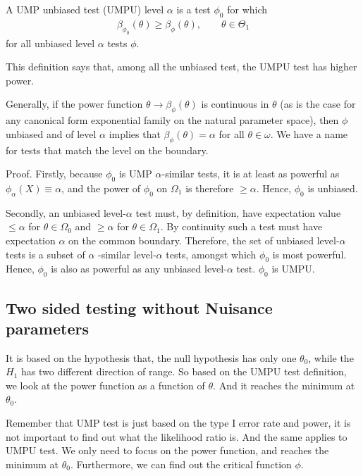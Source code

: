 \documentclass[11pt]{article} %
\begin{document}
\begin{itemize}
A UMP unbiased test (UMPU) level $\alpha$ is a test $\phi_0$ for which
\begin{align*}
	\beta_{\phi_0}(\theta) \geq \beta_{\phi}(\theta), \qquad \theta \in \Theta_1
\end{align*}
for all unbiased level $\alpha$ tests $\phi$.

This definition says that, among all the unbiased test, the UMPU test has higher power.

Generally, if the power function $\theta \rightarrow \beta_{\phi}(\theta)$ is continuous in $\theta$ (as is the case for any canonical form exponential family on the natural parameter space), then $\phi$ unbiased and of level $\alpha$ implies that $\beta_{\phi}(\theta) = \alpha$ for all $ \theta \in \omega $. We have a name for tests that match the level on the boundary.

Proof. Firstly, because $\phi_0$ is UMP $\alpha$-similar tests, it is at least as powerful as $\phi_{\alpha}(X) \equiv \alpha$, and the power of $\phi_0$ on $\Omega_1$ is therefore $\geq \alpha$. Hence, $\phi_0$ is unbiased.

Secondly, an unbiased level-$\alpha$ test must, by definition, have expectation value $\leq \alpha$ for $\theta \in \Omega_0$ and $\geq \alpha$ for $\theta \in \Omega_1$. By continuity such a test must have expectation $\alpha$  on the common boundary. Therefore, the set of unbiased level-$\alpha$  tests is a subset of $\alpha$ -similar level-$\alpha$  tests, amongst which $\phi_0$ is most powerful. Hence, $\phi_0$ is also as powerful as any unbiased level-$\alpha$ test. $\phi_0$ is UMPU.

\end{itemize}



\subsection{Two sided testing without Nuisance parameters}

It is based on the hypothesis that, the null hypothesis has only one $\theta_0$, while the $H_1$ has two different direction of range. So based on the UMPU test definition, we look at the power function as a function of $\theta$. And it reaches the minimum at $\theta_0$.

Remember that UMP test is just based on the type I error rate and power, it is not important to find out what the likelihood ratio is. And the same applies to UMPU test. We only need to focus on the power function, and reaches the minimum at $\theta_0$. Furthermore, we can find out the critical function $\phi$. 
\end{document}
